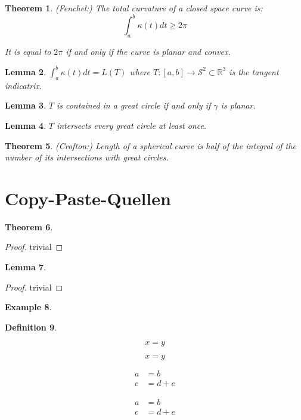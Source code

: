 \documentclass[a4paper,11pt,notitlepage,fullpage]{paper}
\theoremstyle{plain}
\newtheorem{thm}{Theorem}[section] %
\newtheorem{lem}[thm]{Lemma}
\theoremstyle{definition}
\newtheorem{defn}[thm]{Definition} %
\newtheorem{exmp}[thm]{Example} %
\begin{document}
\begin{thm}
(Fenchel:) The total curvature of a closed space curve is:
\begin{equation*}
\int_a^b \kappa(t) dt \geq 2\pi
\end{equation*}

It is equal to $2\pi$ if and only if the curve is planar and convex.

\end{thm}

\begin{lem}
$\int_a^b \kappa(t) dt = L(T)$
where $T:[a,b] \to \mathcal S^2 \subset \mathbb R^3$ is the \emph{tangent indicatrix}.
\end{lem}

\begin{lem}
$T$ is contained in a great circle if and only if $\gamma$ is planar.
\end{lem}

\begin{lem}
$T$ intersects every great circle at least once.
\end{lem}

\begin{thm}
(Crofton:) Length of a spherical curve is half of the integral of the number of its intersections with great circles.
\end{thm}




\section{Copy-Paste-Quellen}



\begin{thm}

\end{thm}
\begin{proof} trivial \end{proof}

\begin{lem}

\end{lem}
\begin{proof} trivial \end{proof}


\begin{exmp}

\end{exmp}


\begin{defn}

\end{defn}



\begin{equation}
x = y
\end{equation}


\begin{equation*}
x = y
\end{equation*}


\begin{align}
a &= b \\
c &= d + e
\end{align}


\begin{align*}
a &= b \\
c &= d + e
\end{align*}





%
%
\end{document}

